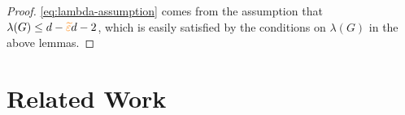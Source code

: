 \documentclass[11pt]{article}
\newcommand{\Subdivision}[2]{{#1}^{#2}}
\newcommand{\MinimalDegree}[1]{\delta(#1)}
\newcommand{\dbtilde}[1]{\tilde{\raisebox{0pt}[0.85\height]{$\tilde{#1}$}}}
\newcommand{\ExpansionFactor}[1]{\lambda(#1)}
\begin{document}
\begin{proof}
\eqref{eq:lambda-assumption} comes from the assumption that $\ExpansionFactor{G} \leq d - \PartitionEps d - 2$, which is easily satisfied by the conditions on $\ExpansionFactor{G}$ in the above lemmas.

\end{proof}

\section{Related Work}
\label{sec:related-work}

\clearpage


\end{document}

